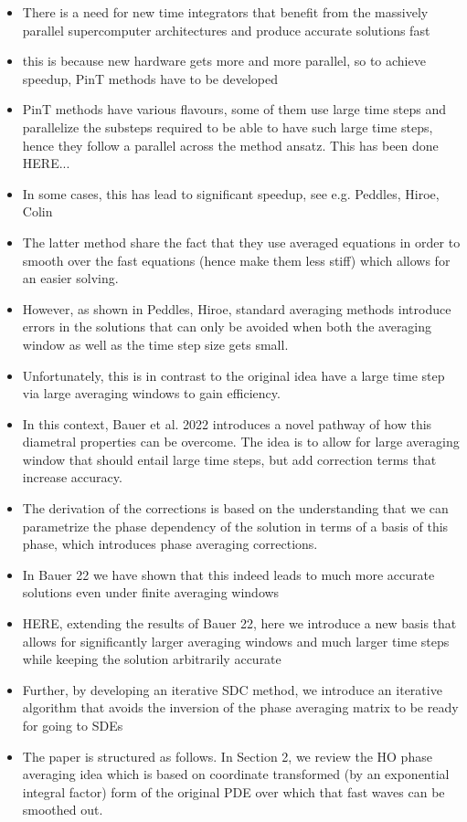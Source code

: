 \documentclass[a4,12pt]{article}
\begin{document}
\begin{itemize}
 \item There is a need for new time integrators that benefit from the massively parallel supercomputer architectures and produce accurate solutions fast
 \item this is because new hardware gets more and more parallel, so to achieve speedup, PinT methods have to be developed
 \item PinT methods have various flavours, some of them use large time steps and parallelize the substeps required to be able to have such large time steps, hence they follow a parallel across the method ansatz. This has been done HERE...
 \item In some cases, this has lead to significant speedup, see e.g. Peddles, Hiroe, Colin
 \item The latter method share the fact that they use averaged equations in order to smooth over the fast equations (hence make them less stiff) which allows for an easier solving.
 \item However, as shown in Peddles, Hiroe, standard averaging methods introduce errors in the solutions that can only be avoided when both the averaging window as well as the time step size gets small.
 \item Unfortunately, this is in contrast to the original idea have a large time step via large averaging windows to gain efficiency.
 \item In this context, Bauer et al. 2022 introduces a novel pathway of how this diametral properties can be overcome. The idea is to allow for large averaging window that should entail large time steps, but add correction terms that increase accuracy.
 \item The derivation of the corrections is based on the understanding that we can parametrize the phase dependency of the solution in terms of a basis of this phase, which introduces phase averaging corrections.
 \item In Bauer 22 we have shown that this indeed leads to much more accurate solutions even under finite averaging windows
 \item HERE, extending the results of Bauer 22, here we introduce a new basis that allows for significantly larger averaging windows and much larger time steps while keeping the solution arbitrarily accurate
 \item Further, by developing an iterative SDC method, we introduce an iterative algorithm that avoids the inversion of the phase averaging matrix to be ready for going to SDEs
 \item The paper is structured as follows.
 In Section 2, we review the HO phase averaging idea which is based on coordinate transformed (by an exponential integral factor) form of the original PDE over which that fast waves can be smoothed out.


\end{itemize}
\end{document}
